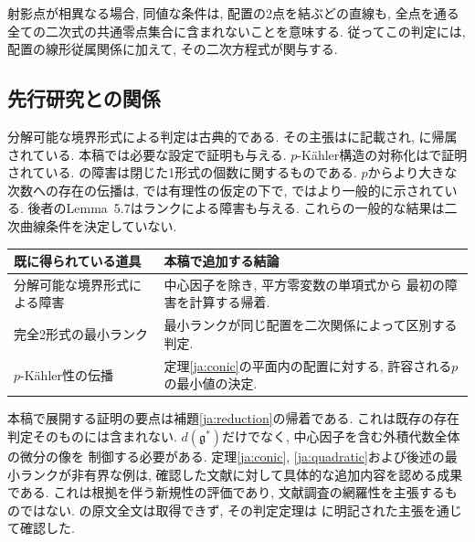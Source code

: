 \documentclass[12pt]{amsart}
\theoremstyle{definition}
\theoremstyle{remark}
\numberwithin{equation}{section}
\begin{document}
射影点が相異なる場合, 同値な条件は, 配置の2点を結ぶどの直線も,
全点を通る全ての二次式の共通零点集合に含まれないことを意味する.
従ってこの判定には, 配置の線形従属関係に加えて, その二次方程式が関与する.

\subsection*{先行研究との関係}
分解可能な境界形式による判定は古典的である.
その主張は\cite[Proposition~2.15]{ja:LGM26}に記載され,
\cite[Theorem~3.2]{ja:AB91}に帰属されている. 本稿では必要な設定で証明も与える.
$p$-K\"ahler構造の対称化は\cite[Lemma~2.4]{ja:FM24}で証明されている.
\cite[Theorem~2.3]{ja:ST22}の障害は閉じた1形式の個数に関するものである.
$p$からより大きな次数への存在の伝播は,
\cite[Theorem~4.1, プレプリント版]{ja:LG25}では有理性の仮定の下で,
\cite[Theorem~5.4]{ja:LGM26}ではより一般的に示されている.
後者のLemma~5.7はランクによる障害も与える.
これらの一般的な結果は二次曲線条件を決定していない.

\begin{center}\small
\begin{tabular}{>{\raggedright\arraybackslash}p{4.5cm}>{\raggedright\arraybackslash}p{8.2cm}}
\hline
既に得られている道具 & 本稿で追加する結論\\\hline
分解可能な境界形式による障害 & 中心因子を除き, 平方零変数の単項式から
最初の障害を計算する帰着.\\
完全2形式の最小ランク & 最小ランクが同じ配置を二次関係によって区別する判定.\\
$p$-K\"ahler性の伝播 & 定理\ref{ja:conic}の平面内の配置に対する,
許容される$p$の最小値の決定.\\\hline
\end{tabular}
\end{center}

本稿で展開する証明の要点は補題\ref{ja:reduction}の帰着である.
これは既存の存在判定そのものには含まれない.
$d(\mathfrak g^*)$だけでなく, 中心因子を含む外積代数全体の微分の像を
制御する必要がある.
定理\ref{ja:conic}, \ref{ja:quadratic}および後述の最小ランクが非有界な例は,
確認した文献に対して具体的な追加内容を認める成果である.
これは根拠を伴う新規性の評価であり, 文献調査の網羅性を主張するものではない.
\cite{ja:AB91}の原文全文は取得できず, その判定定理は
\cite{ja:LGM26}に明記された主張を通じて確認した.
\end{document}
